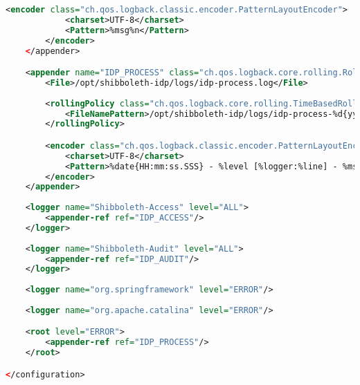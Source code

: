 \begin{lstlisting}[language=xml]
        <encoder class="ch.qos.logback.classic.encoder.PatternLayoutEncoder">
            <charset>UTF-8</charset>
            <Pattern>%msg%n</Pattern>
        </encoder>
    </appender>

    <appender name="IDP_PROCESS" class="ch.qos.logback.core.rolling.RollingFileAppender">
        <File>/opt/shibboleth-idp/logs/idp-process.log</File>
        
        <rollingPolicy class="ch.qos.logback.core.rolling.TimeBasedRollingPolicy">
            <FileNamePattern>/opt/shibboleth-idp/logs/idp-process-%d{yyyy-MM-dd}.log</FileNamePattern>
        </rollingPolicy>

        <encoder class="ch.qos.logback.classic.encoder.PatternLayoutEncoder">
            <charset>UTF-8</charset>
            <Pattern>%date{HH:mm:ss.SSS} - %level [%logger:%line] - %msg%n</Pattern>
        </encoder>
    </appender>
  
    <logger name="Shibboleth-Access" level="ALL">
        <appender-ref ref="IDP_ACCESS"/>
    </logger>
    
    <logger name="Shibboleth-Audit" level="ALL">
        <appender-ref ref="IDP_AUDIT"/>
    </logger>
        
    <logger name="org.springframework" level="ERROR"/>
    
    <logger name="org.apache.catalina" level="ERROR"/>

    <root level="ERROR">
        <appender-ref ref="IDP_PROCESS"/>
    </root>

</configuration>
\end{lstlisting}

